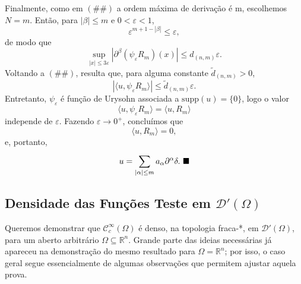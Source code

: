 \documentclass[../distribution_theory_notes.tex]{subfiles}
\begin{document}
\begin{proof*}
	Finalmente, como em \((\#\#)\) a ordem máxima de derivação é m, escolhemos \(N=m\). Então, para \(|\beta |\leq m\) e \(0<\varepsilon <1\),
	\[
		\varepsilon^{m+1-|\beta |}\leq \varepsilon,
	\]
	de modo que
	\[
		\sup_{|x|\leq 3\varepsilon }|\partial^{\beta }(\psi_{\varepsilon }R_{m})(x)|\leq d_{(n,m)}\varepsilon .
	\]
	Voltando a \((\#\#)\), resulta que, para alguma constante \(\widetilde{d}_{(n,m)}>0\),
	\[
		|\langle u, \psi_{\varepsilon }R_{m}\rangle |\leq \widetilde{d}_{(n,m)}\varepsilon .
	\]
	Entretanto, \(\psi_{\varepsilon }\) é função de Urysohn associada a \(\mathrm{supp}(u)=\{0\}\), logo o valor
	\[
		\langle u, \psi_{\varepsilon }R_{m}\rangle=\langle u, R_{m}\rangle
	\]
	independe de \(\varepsilon \). Fazendo \(\varepsilon \to 0^{+}\), concluímos que
	\[
		\langle u, R_{m}\rangle=0,
	\]
	e, portanto,
	\[
		u=\sum\limits_{|\alpha |\leq m}^{}a_{\alpha }\partial^{\alpha }\delta . \text{ $\blacksquare$}
	\]
\end{proof*}

\subsection{Densidade das Funções Teste em \(\mathcal{D}'(\Omega )\)}
Queremos demonstrar que \(\mathcal{C}_{c}^{\infty}(\Omega )\) é denso, na topologia fraca-*, em \(\mathcal{D}'(\Omega )\), para um aberto arbitrário \(\Omega \subseteq \mathbb{R}^{n}\). Grande parte das ideias necessárias já apareceu na demonstração do mesmo resultado para \(\Omega =\mathbb{R}^{n}\); por isso, o caso geral segue essencialmente de algumas observações que permitem ajustar aquela prova.
\end{document}

